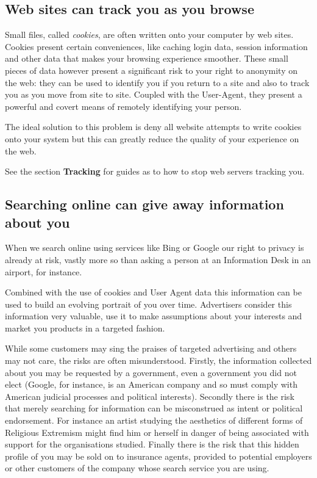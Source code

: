 \subsection{Web sites can track you as you browse}

Small files, called \emph{cookies}, are often written onto your computer
by web sites. Cookies present certain conveniences, like caching login
data, session information and other data that makes your browsing
experience smoother. These small pieces of data however present a
significant risk to your right to anonymity on the web: they can be used
to identify you if you return to a site and also to track you as you
move from site to site. Coupled with the User-Agent, they present a
powerful and covert means of remotely identifying your person.

The ideal solution to this problem is deny all website attempts to write
cookies onto your system but this can greatly reduce the quality of your
experience on the web.

See the section \textbf{Tracking} for guides as to how to stop web
servers tracking you.

\subsection{Searching online can give away information about you}

When we search online using services like Bing or Google our right to
privacy is already at risk, vastly more so than asking a person at an
Information Desk in an airport, for instance.

Combined with the use of cookies and User Agent data this information
can be used to build an evolving portrait of you over time. Advertisers
consider this information very valuable, use it to make assumptions
about your interests and market you products in a targeted fashion.

While some customers may sing the praises of targeted advertising and
others may not care, the risks are often misunderstood. Firstly, the
information collected about you may be requested by a government, even a
government you did not elect (Google, for instance, is an American
company and so must comply with American judicial processes and
political interests). Secondly there is the risk that merely searching
for information can be misconstrued as intent or political endorsement.
For instance an artist studying the aesthetics of different forms of
Religious Extremism might find him or herself in danger of being
associated with support for the organisations studied. Finally there is
the risk that this hidden profile of you may be sold on to insurance
agents, provided to potential employers or other customers of the
company whose search service you are using.

